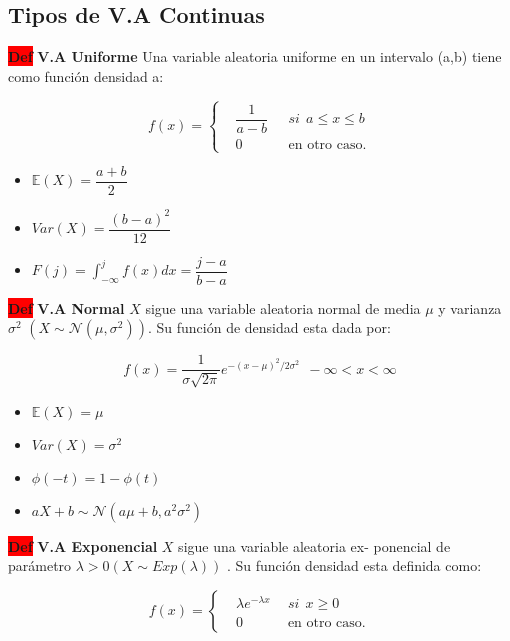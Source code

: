 \documentclass[letterpaper,10.5pt,twocolumn]{article} %
\newcommand{\E}{\mathbb{E} }
\newcommand{\hlc}[2][yellow]{ \colorbox{#1}{#2} }
\newcommand{\Def}{\hlc[red]{\bfseries Def}}
\let\oldfrac=\frac
\renewcommand{\frac}[2]{\ensuremath{\oldfrac{#1}{#2}}}
\begin{document}

\subsection{Tipos de V.A Continuas}

\Def \textbf{V.A Uniforme}
Una variable aleatoria uniforme en un intervalo (a,b) tiene
como función densidad a:

\begin{equation*}
f(x)= \left\{
\begin{aligned}
    &\dfrac{1}{a-b}\ \ \ &si\ \  a\leq x \leq b\\
    &0 &\textrm{en otro caso.}
\end{aligned}
\right.    
\end{equation*}

\begin{itemize}
    \item $\E(X)=\dfrac{a+b}{2} $
    \item $Var(X) = \dfrac{(b-a)^2}{12} $
    \item $F(j) = \int_{-\infty}^{j} f(x)dx = \dfrac{j-a}{b-a} $
\end{itemize}

\Def \textbf{V.A Normal} $X$ sigue una variable aleatoria normal
de media $\mu$ y varianza $\sigma^2$ $(X \sim \mathcal{N}(\mu,\sigma^2 ))$. Su función de
densidad esta dada por:

\begin{equation*}
    f(x) = \frac{1}{\sigma\sqrt{2\pi}} e^{-(x-\mu)^2 / 2\sigma^2} \ \ -\infty <x < \infty
\end{equation*}

\begin{itemize}
    \item $\E(X)=\mu $
    \item $Var(X) = \sigma^2 $
    \item $\phi(-t) = 1- \phi(t) $
    \item $aX+b \sim \mathcal{N}(a\mu + b, a^2 \sigma^2) $
\end{itemize}

\Def \textbf{V.A Exponencial} $X$ sigue una variable aleatoria ex-
ponencial de parámetro $\lambda > 0 (X \sim Exp(\lambda))$ . Su función
densidad esta definida como:

\begin{equation*}
f(x)= \left\{
\begin{aligned}
    &\lambda e^{-\lambda x}\ \ &si\ \ x \geq 0\\
    &0 &\textrm{en otro caso.}
\end{aligned}
\right.    
\end{equation*}
\end{document}
